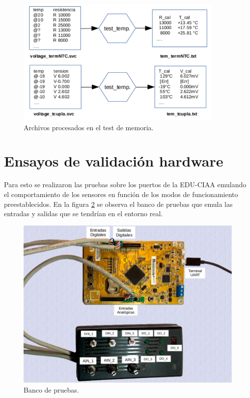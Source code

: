 \begin{figure}[h!]
	\centering
	\includegraphics[width=0.9\textwidth]{Figures/Cap_4/files_test_memoria}
	\caption{Archivos procesados en el test de memoria.}
	\label{fig:files_test_mem}
\end{figure}


\section{ Ensayos de validación hardware }
\label{sec:pruebasHW}

Para esto se realizaron las pruebas sobre los puertos de la EDU-CIAA emulando el comportamiento de los sensores en función de los modos de funcionamiento preestablecidos. En la figura \ref{fig:foto_prototipo} se observa el banco de pruebas que emula las entradas y salidas que se tendrían en el entorno real.
\begin{figure}[h!]
	\centering
	\includegraphics[width=1.0\textwidth]{Figures/Cap_4/foto_prototipo}
	\caption{Banco de pruebas.}
	\label{fig:foto_prototipo}
\end{figure}

